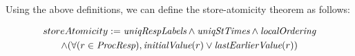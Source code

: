 Using the above definitions, we can define the store-atomicity theorem as follows:
\begin{thm}
\small
\begin{multline*}
storeAtomicity := 
\textit{uniqRespLabels} \wedge
\textit{uniqStTimes} \wedge \textit{localOrdering}\\ \wedge 
(\forall (r \in \textit{ProcResp}), \textit{initialValue}(r) \vee \textit{lastEarlierValue}(r))
\end{multline*}
\end{thm}
